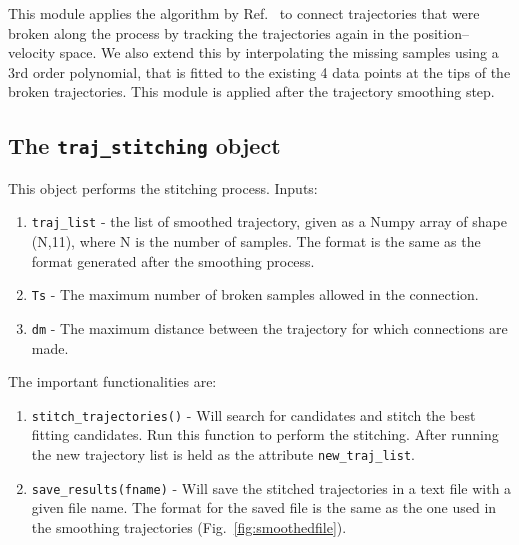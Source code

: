 \documentclass[10pt,a4paper]{article}
\begin{document}
This module applies the algorithm by Ref.~\cite{Xu2008} to connect trajectories that were broken along the process by tracking the trajectories again in the position--velocity space. We also extend this by interpolating the missing samples using a 3rd order polynomial, that is fitted to the existing 4 data points at the tips of the broken trajectories. This module is applied after the trajectory smoothing step.




\subsection{The \texttt{traj\_stitching} object}

This object performs the stitching process. Inputs:

\begin{enumerate}
	\item \texttt{traj\_list} - the list of smoothed trajectory, given as a Numpy array of shape (N,11), where N is the number of samples. The format is the same as the format generated after the smoothing process.
	\item \texttt{Ts} - The maximum number of broken samples allowed in the connection.
	\item \texttt{dm} - The maximum distance between the trajectory for which connections are made.
\end{enumerate}



The important functionalities are:

\begin{enumerate}
	\item \texttt{stitch\_trajectories()} - Will search for candidates and stitch the best fitting candidates. Run this function to perform the stitching. After running the new trajectory list is held as the attribute \texttt{new\_traj\_list}.
	
	\item \texttt{save\_results(fname)} - Will save the stitched trajectories in a text file with a given file name. The format for the saved file is the same as the one used in the smoothing trajectories (Fig.~\ref{fig:smoothedfile}).
\end{enumerate}







\end{document}
